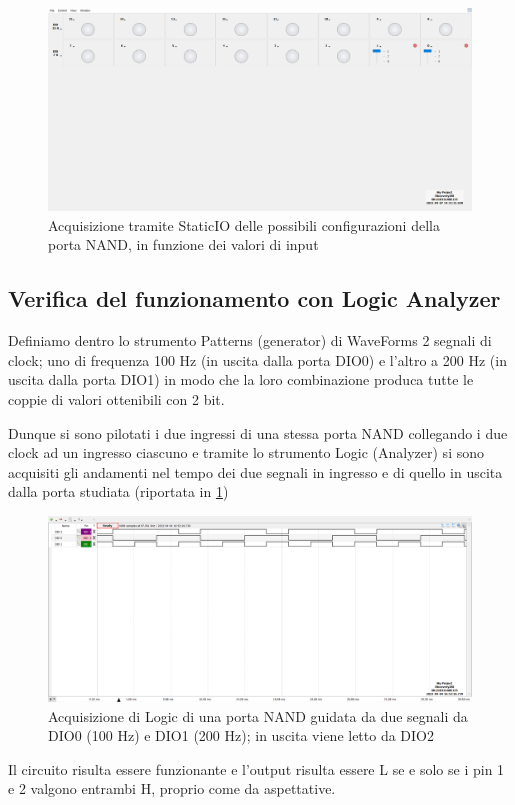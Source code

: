 \documentclass[10pt, a4paper, italian]{article}
\begin{document}
\begin{figure}[htbp]
	\includegraphics[scale=0.21]{static_nand11}
	\caption{Acquisizione tramite StaticIO delle possibili configurazioni della
	porta NAND, in funzione dei valori di input}
\end{figure}
\subsection{Verifica del funzionamento con Logic Analyzer}
Definiamo dentro lo strumento Patterns (generator) di WaveForms 2 segnali
di clock; uno di frequenza 100 Hz (in uscita dalla porta DIO0) e l'altro a
200 Hz (in uscita dalla porta DIO1) in modo che la loro combinazione produca
tutte le coppie di valori ottenibili con 2 bit.

Dunque si sono pilotati i due ingressi di una stessa porta NAND collegando
i due clock ad un ingresso ciascuno e tramite lo strumento Logic (Analyzer)
si sono acquisiti gli andamenti nel tempo dei due segnali in ingresso e di
quello in uscita dalla porta studiata (riportata in \cref{fig: nand_time})
\begin{figure}[htbp]
\centering
	\includegraphics[scale=0.4]{nand_time}
	\caption{Acquisizione di Logic di una porta NAND guidata da due segnali da
	DIO0 (100 Hz) e DIO1 (200 Hz); in uscita viene letto da DIO2}
	\label{fig: nand_time}
\end{figure}
Il circuito risulta essere funzionante e l'output risulta essere L se e solo
se i pin 1 e 2 valgono entrambi H, proprio come da aspettative.
\end{document}
